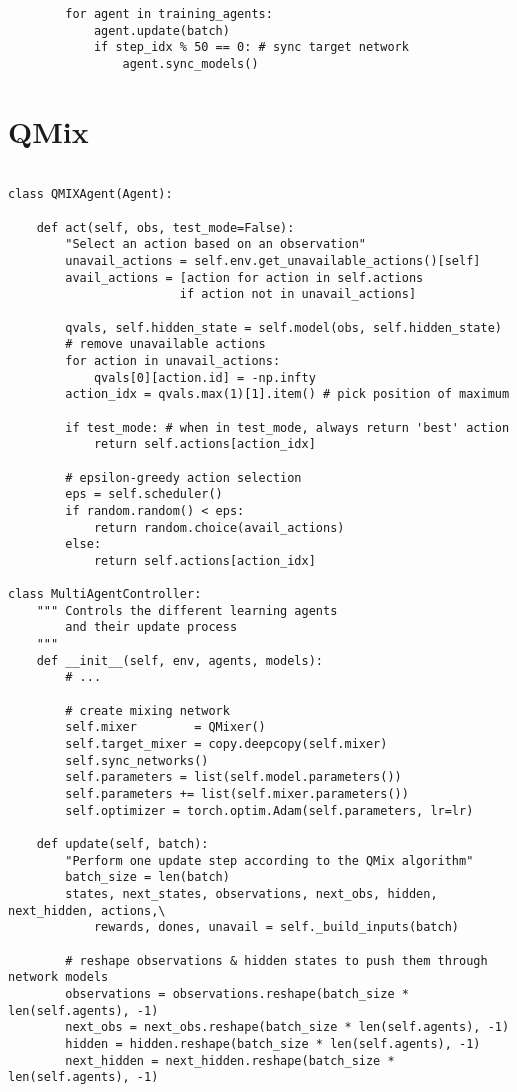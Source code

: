 \begin{appendices}
\begin{verbatim}
        for agent in training_agents:
            agent.update(batch)
            if step_idx % 50 == 0: # sync target network
                agent.sync_models()
\end{verbatim}

\chapter{QMix}
\label{app:qmix}
\begin{verbatim}

class QMIXAgent(Agent):

    def act(self, obs, test_mode=False):
        "Select an action based on an observation"
        unavail_actions = self.env.get_unavailable_actions()[self]
        avail_actions = [action for action in self.actions
                        if action not in unavail_actions]

        qvals, self.hidden_state = self.model(obs, self.hidden_state)
        # remove unavailable actions
        for action in unavail_actions:
            qvals[0][action.id] = -np.infty
        action_idx = qvals.max(1)[1].item() # pick position of maximum
    
        if test_mode: # when in test_mode, always return 'best' action
            return self.actions[action_idx]
        
        # epsilon-greedy action selection
        eps = self.scheduler()
        if random.random() < eps:
            return random.choice(avail_actions)
        else:
            return self.actions[action_idx]

class MultiAgentController:
    """ Controls the different learning agents
        and their update process
    """
    def __init__(self, env, agents, models):
        # ...
        
        # create mixing network
        self.mixer        = QMixer()
        self.target_mixer = copy.deepcopy(self.mixer)
        self.sync_networks()
        self.parameters = list(self.model.parameters())
        self.parameters += list(self.mixer.parameters())
        self.optimizer = torch.optim.Adam(self.parameters, lr=lr)

    def update(self, batch):
        "Perform one update step according to the QMix algorithm"
        batch_size = len(batch)
        states, next_states, observations, next_obs, hidden, next_hidden, actions,\
            rewards, dones, unavail = self._build_inputs(batch)
        
        # reshape observations & hidden states to push them through network models
        observations = observations.reshape(batch_size * len(self.agents), -1)
        next_obs = next_obs.reshape(batch_size * len(self.agents), -1)
        hidden = hidden.reshape(batch_size * len(self.agents), -1)
        next_hidden = next_hidden.reshape(batch_size * len(self.agents), -1)
        

\end{verbatim}
\end{appendices}
